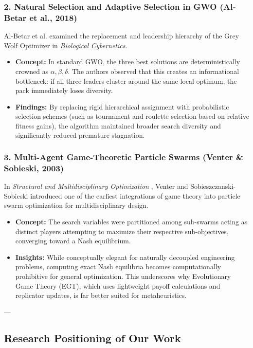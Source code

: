 \subsubsection{2. Natural Selection and Adaptive Selection in GWO (Al-Betar et al., 2018)}
Al-Betar et al. \cite{albetar2018natural} examined the replacement and leadership hierarchy of the Grey Wolf Optimizer in \textit{Biological Cybernetics}.
\begin{itemize}
    \item \textbf{Concept:} In standard GWO, the three best solutions are deterministically crowned as $\alpha, \beta, \delta$. The authors observed that this creates an informational bottleneck: if all three leaders cluster around the same local optimum, the pack immediately loses diversity.
    \item \textbf{Findings:} By replacing rigid hierarchical assignment with probabilistic selection schemes (such as tournament and roulette selection based on relative fitness gains), the algorithm maintained broader search diversity and significantly reduced premature stagnation.
\end{itemize}

\subsubsection{3. Multi-Agent Game-Theoretic Particle Swarms (Venter \& Sobieski, 2003)}
In \textit{Structural and Multidisciplinary Optimization} \cite{venter2003particle}, Venter and Sobieszczanski-Sobieski introduced one of the earliest integrations of game theory into particle swarm optimization for multidisciplinary design.
\begin{itemize}
    \item \textbf{Concept:} The search variables were partitioned among sub-swarms acting as distinct players attempting to maximize their respective sub-objectives, converging toward a Nash equilibrium.
    \item \textbf{Insights:} While conceptually elegant for naturally decoupled engineering problems, computing exact Nash equilibria becomes computationally prohibitive for general optimization. This underscores why Evolutionary Game Theory (EGT), which uses lightweight payoff calculations and replicator updates, is far better suited for metaheuristics.
\end{itemize}

---

\subsection{Research Positioning of Our Work}

